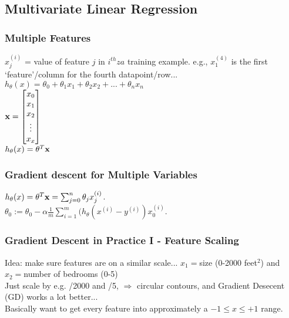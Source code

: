 \documentclass[11pt,a4paper]{article}
\begin{document}
    \subsection{Multivariate Linear Regression}
    \subsubsection{Multiple Features}
    $x_{j}^{(i)}$ = value of feature $j$ in $i^{th}za$ training example. 
    e.g., $x_{1}^{(4)}$ is the first `feature'/column for the fourth datapoint/row...\\
    
    $h_{\theta}(x) = \theta_{0} + \theta_{1}x_{1} + \theta_{2}x_{2} + ... + \theta_{n}x_{n}$\\
    
    $
    {\bf x} = \begin{bmatrix}
      x_{0}  \\
      x_{1}  \\
      x_{2}  \\
      \vdots \\
      x_{x}  \\
    \end{bmatrix}
    $
    \\
   $h_{\theta}(x)= \theta^{T}{\bf x}$\\

    \subsubsection{Gradient descent for Multiple Variables}
    $h_{\theta}(x)= \theta^{T}{\bf x}  =    \sum_{j=0}^{n} \theta_{j}x_{j}^{(i)}$. \\
    $\theta_{0} := \theta_{0}  - \alpha \frac{1}{m}\sum_{i=1}^{m}(h_{\theta} (x^{(i)}-y^{(i)})x_{0}^{(i)}.$\\

    \subsubsection{Gradient Descent in Practice I - Feature Scaling}
    Idea: make sure features are on a similar scale...
    $x_{1}=$size (0-2000 feet$^{2}$) and $x_{2}=$number of bedrooms (0-5)\\
    Just scale by e.g. /2000 and /5, $\Rightarrow$ circular contours, 
    and Gradient Desecent (GD) works a lot better...\\
    Basically want to get every feature into approximately a $-1 \leq x \leq +1$ range. 
\end{document}
